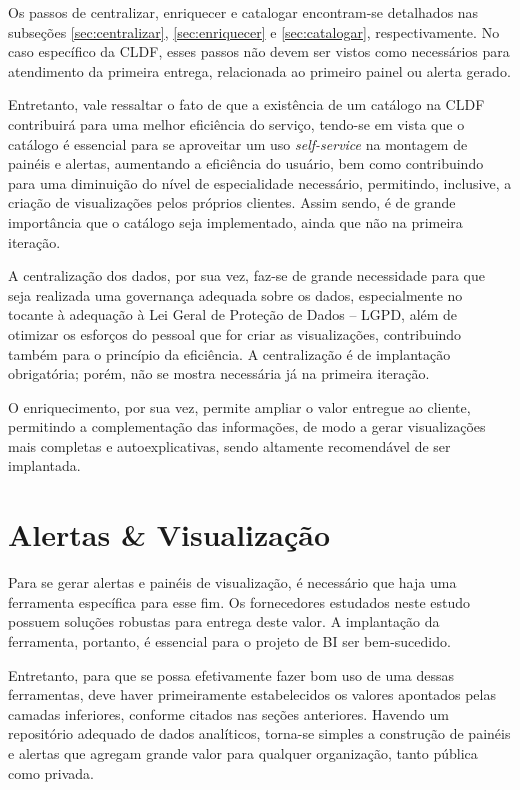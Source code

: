 Os passos de centralizar, enriquecer e catalogar encontram-se detalhados nas subseções \ref{sec:centralizar}, \ref{sec:enriquecer} e \ref{sec:catalogar}, respectivamente. No caso específico da CLDF, esses passos não devem ser vistos como necessários para atendimento da primeira entrega, relacionada ao primeiro painel ou alerta gerado.

Entretanto, vale ressaltar o fato de que a existência de um catálogo na CLDF contribuirá para uma melhor eficiência do serviço, tendo-se em vista que o catálogo é essencial para se aproveitar um uso \emph{self-service} na montagem de painéis e alertas, aumentando a eficiência do usuário, bem como contribuindo para uma diminuição do nível de especialidade necessário, permitindo, inclusive, a criação de visualizações pelos próprios clientes. Assim sendo, é de grande importância que o catálogo seja implementado, ainda que não na primeira iteração.

A centralização dos dados, por sua vez, faz-se de grande necessidade para que seja realizada uma governança adequada sobre os dados, especialmente no tocante à adequação à Lei Geral de Proteção de Dados -- LGPD, além de otimizar os esforços do pessoal que for criar as visualizações, contribuindo também para o princípio da eficiência. A centralização é de implantação obrigatória; porém, não se mostra necessária já na primeira iteração.

O enriquecimento, por sua vez, permite ampliar o valor entregue ao cliente, permitindo a complementação das informações, de modo a gerar visualizações mais completas e autoexplicativas, sendo altamente recomendável de ser implantada.

\section{Alertas \& Visualização}

Para se gerar alertas e painéis de visualização, é necessário que haja uma ferramenta específica para esse fim. Os fornecedores estudados neste estudo possuem soluções robustas para entrega deste valor. A implantação da ferramenta, portanto, é essencial para o projeto de BI ser bem-sucedido.

Entretanto, para que se possa efetivamente fazer bom uso de uma dessas ferramentas, deve haver primeiramente estabelecidos os valores apontados pelas camadas inferiores, conforme citados nas seções anteriores. Havendo um repositório adequado de dados analíticos, torna-se simples a construção de painéis e alertas que agregam grande valor para qualquer organização, tanto pública como privada.

